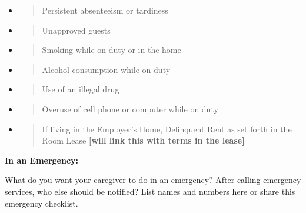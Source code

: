 \documentclass[]{article}
\begin{document}
\begin{itemize}
\item
  \begin{quote}
  Persistent absenteeism or tardiness
  \end{quote}
\end{itemize}

\begin{itemize}
\item
  \begin{quote}
  Unapproved guests
  \end{quote}
\end{itemize}

\begin{itemize}
\item
  \begin{quote}
  Smoking while on duty or in the home
  \end{quote}
\end{itemize}

\begin{itemize}
\item
  \begin{quote}
  Alcohol consumption while on duty
  \end{quote}
\end{itemize}

\begin{itemize}
\item
  \begin{quote}
  Use of an illegal drug
  \end{quote}
\end{itemize}

\begin{itemize}
\item
  \begin{quote}
  Overuse of cell phone or computer while on duty
  \end{quote}
\end{itemize}

\begin{itemize}
\item
  \begin{quote}
  If living in the Employer's Home, Delinquent Rent as set forth in the
  Room Lease \textbf{{[}will link this with terms in the lease{]}}
  \end{quote}
\end{itemize}

\textbf{In an Emergency:}

What do you want your caregiver to do in an emergency? After calling
emergency services, who else should be notified? List names and numbers
here or share this emergency checklist.
\end{document}
